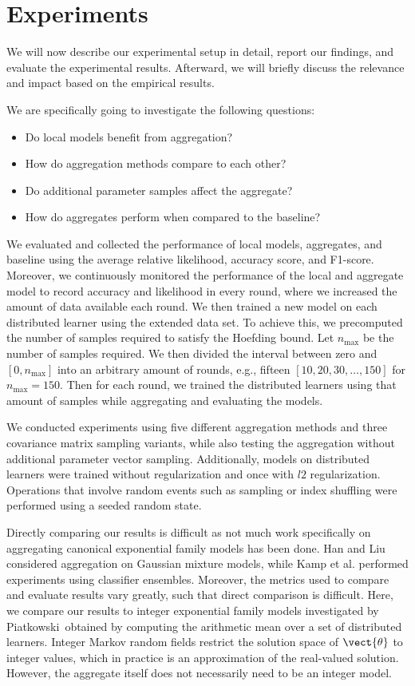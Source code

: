 
\chapter{Experiments}
\label{chapter:ch5}
We will now describe our experimental setup in detail, report our findings, and evaluate the experimental results.
Afterward, we will briefly discuss the relevance and impact based on the empirical results.

We are specifically going to investigate the following questions:
\begin{itemize}
    \item Do local models benefit from aggregation?
    \item How do aggregation methods compare to each other? 
    \item Do additional parameter samples affect the aggregate?
    \item How do aggregates perform when compared to the baseline?
\end{itemize}
We evaluated and collected the performance of local models, aggregates, and baseline using the average relative likelihood, accuracy score, and F1-score. 
Moreover, we continuously monitored the performance of the local and aggregate model to record accuracy and likelihood in every round, where we increased the amount of data available each round.
We then trained a new model on each distributed learner using the extended data set.
To achieve this, we precomputed the number of samples required to satisfy the Hoefding bound. 
Let $n_{\max}$ be the number of samples required.
We then divided the interval between zero and $[0, n_{\max}]$ into an arbitrary amount of rounds, e.g., fifteen $[10,20,30, \ldots, 150]$ for $n_{\max} = 150$. 
Then for each round, we trained the distributed learners using that amount of samples while aggregating and evaluating the models.
 
We conducted experiments using five different aggregation methods and three covariance matrix sampling variants, while also testing the aggregation without additional parameter vector sampling.
Additionally, models on distributed learners were trained without regularization and once with $l2$ regularization.
Operations that involve random events such as sampling or index shuffling were performed using a seeded random state.

Directly comparing our results is difficult as not much work specifically on aggregating canonical exponential family models has been done. Han and Liu\cite{han2016bootstrap} considered aggregation on Gaussian mixture models, while Kamp et al. \cite{kamp2017effective} performed experiments using classifier ensembles.
Moreover, the metrics used to compare and evaluate results vary greatly, such that direct comparison is difficult.
Here, we compare our results to integer exponential family models investigated by Piatkowski~\cite{piatkowski2018exponential}obtained by computing the arithmetic mean over a set of distributed learners. 
Integer Markov random fields restrict the solution space of $\vect{\theta}$ to integer values, which in practice is an approximation of the real-valued solution.
However, the aggregate itself does not necessarily need to be an integer model.

